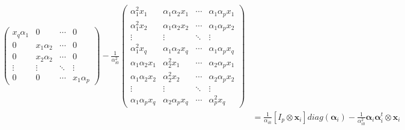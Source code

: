 \documentclass[10pt]{article}
\theoremstyle{definition}
\begin{document}
\begin{align*}
\begin{pmatrix}
x_q\alpha_1 & 0 & \cdots & 0 \\
0 & x_1 \alpha_2 & \cdots & 0 \\
0 & x_2 \alpha_2 & \cdots & 0 \\
\vdots & \vdots & \ddots & \vdots \\
0 & 0 & \cdots & x_1 \alpha_p
\end{pmatrix} - \frac{1}{\alpha_{i0}^2}\begin{pmatrix} \alpha_1^2 x_1 & \alpha_1\alpha_2 x_1 & \cdots & \alpha_1\alpha_p x_1 \\
\alpha_1^2 x_2 &\alpha_1\alpha_2 x_2 & \cdots &  \alpha_1\alpha_p x_2\\
\vdots & \vdots &\ddots & \vdots \\
\alpha_1^2 x_q & \alpha_1\alpha_2 x_q & \cdots & \alpha_1 \alpha_p x_q\\
\alpha_1\alpha_2x_1 & \alpha_2^2  x_1 & \cdots & \alpha_2 \alpha_p x_1 \\
\alpha_1\alpha_2x_2 & \alpha_2^2  x_2 & \cdots & \alpha_2 \alpha_p x_2\\
\vdots & \vdots & \ddots &\vdots \\
\alpha_1\alpha_p x_q & \alpha_2\alpha_p x_q & \cdots & \alpha_p^2 x_q\end{pmatrix}\\
&= \frac{1}{\alpha_{i0}}[I_p \otimes \mathbf{x}_i] diag(\boldsymbol\alpha_i) - \frac{1}{\alpha_{i0}^2} \boldsymbol\alpha_i \boldsymbol\alpha_i^t \otimes \mathbf{x}_i

\end{align*}
\end{document}
